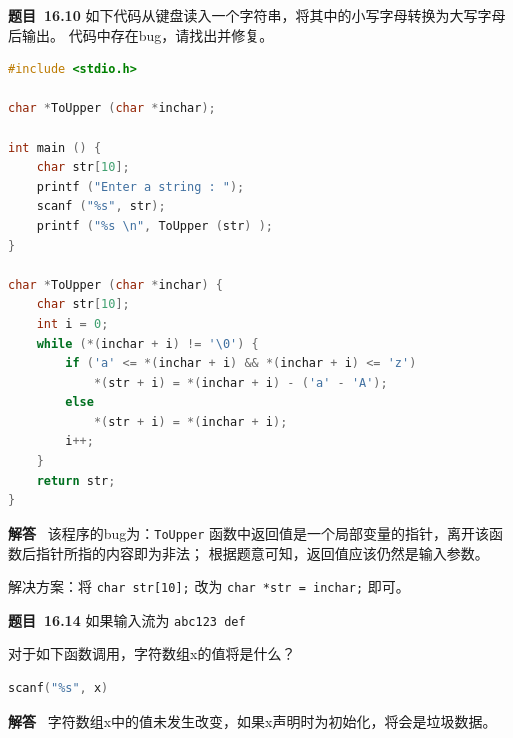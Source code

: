 \documentclass[10pt,a4paper,UTF8]{ctexart}
\newcommand{\problemname}{待定义}
\newenvironment{problem}{\begin{shaded}\par\noindent\textbf{题目\  \problemname}}{\end{shaded}\par}
\newenvironment{solution}{\par\noindent\textbf{解答}\ }{\par}
\begin{document}
\renewcommand{\problemname}{16.10}
\begin{problem}
	如下代码从键盘读入一个字符串，将其中的小写字母转换为大写字母后输出。
	代码中存在bug，请找出并修复。
	\begin{lstlisting}[language=C]
#include <stdio.h> 

char *ToUpper (char *inchar); 
		
int main () { 
	char str[10]; 
	printf ("Enter a string : "); 
	scanf ("%s", str); 
	printf ("%s \n", ToUpper (str) ); 
} 

char *ToUpper (char *inchar) { 
	char str[10]; 
	int i = 0; 
	while (*(inchar + i) != '\0') { 
		if ('a' <= *(inchar + i) && *(inchar + i) <= 'z') 
			*(str + i) = *(inchar + i) - ('a' - 'A'); 
		else 
			*(str + i) = *(inchar + i); 
		i++; 
	} 
	return str; 
} 	
	\end{lstlisting}
\end{problem}

\begin{solution}
	该程序的bug为：\verb|ToUpper| 函数中返回值是一个局部变量的指针，离开该函数后指针所指的内容即为非法；
	根据题意可知，返回值应该仍然是输入参数。

	解决方案：将 \verb|char str[10];| 改为 \verb|char *str = inchar;| 即可。
\end{solution}


\renewcommand{\problemname}{16.14}
\begin{problem}
	如果输入流为 \verb|abc123 def|

	对于如下函数调用，字符数组x的值将是什么？
	\begin{lstlisting}[language=C]
scanf("%s", x)
	\end{lstlisting}
\end{problem}

\begin{solution}
	字符数组x中的值未发生改变，如果x声明时为初始化，将会是垃圾数据。
\end{solution}
\end{document}
